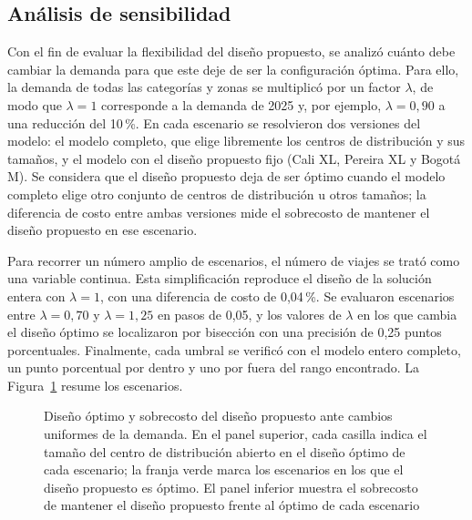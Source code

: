 \documentclass[fleqn, 11pt,letterpaper]{article}
\begin{document}
\subsection{Análisis de sensibilidad}
\label{sec:sensibilidad}
Con el fin de evaluar la flexibilidad del diseño propuesto, se analizó cuánto debe cambiar la demanda para que este deje de ser la configuración óptima. Para ello, la demanda de todas las categorías y zonas se multiplicó por un factor $\lambda$, de modo que $\lambda = 1$ corresponde a la demanda de 2025 y, por ejemplo, $\lambda = 0{,}90$ a una reducción del 10\,\%. En cada escenario se resolvieron dos versiones del modelo: el modelo completo, que elige libremente los centros de distribución y sus tamaños, y el modelo con el diseño propuesto fijo (Cali XL, Pereira XL y Bogotá M). Se considera que el diseño propuesto deja de ser óptimo cuando el modelo completo elige otro conjunto de centros de distribución u otros tamaños; la diferencia de costo entre ambas versiones mide el sobrecosto de mantener el diseño propuesto en ese escenario.

Para recorrer un número amplio de escenarios, el número de viajes se trató como una variable continua. Esta simplificación reproduce el diseño de la solución entera con $\lambda = 1$, con una diferencia de costo de 0,04\,\%. Se evaluaron escenarios entre $\lambda = 0{,}70$ y $\lambda = 1{,}25$ en pasos de 0,05, y los valores de $\lambda$ en los que cambia el diseño óptimo se localizaron por bisección con una precisión de 0,25 puntos porcentuales. Finalmente, cada umbral se verificó con el modelo entero completo, un punto porcentual por dentro y uno por fuera del rango encontrado. La Figura~\ref{fig:mapa_disenos} resume los escenarios.

\begin{figure}[H]
    \centering
    
    \caption{Diseño óptimo y sobrecosto del diseño propuesto ante cambios uniformes de la demanda. En el panel superior, cada casilla indica el tamaño del centro de distribución abierto en el diseño óptimo de cada escenario; la franja verde marca los escenarios en los que el diseño propuesto es óptimo. El panel inferior muestra el sobrecosto de mantener el diseño propuesto frente al óptimo de cada escenario}
    \label{fig:mapa_disenos}
\end{figure}
\end{document}
